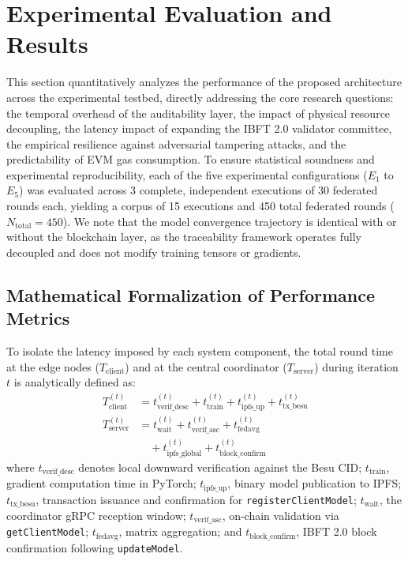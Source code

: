 \section{Experimental Evaluation and Results}
\label{sec:evaluacion}

This section quantitatively analyzes the performance of the proposed architecture across the experimental testbed, directly addressing the core research questions: the temporal overhead of the auditability layer, the impact of physical resource decoupling, the latency impact of expanding the IBFT 2.0 validator committee, the empirical resilience against adversarial tampering attacks, and the predictability of EVM gas consumption. To ensure statistical soundness and experimental reproducibility, each of the five experimental configurations ($E_1$ to $E_5$) was evaluated across 3 complete, independent executions of 30 federated rounds each, yielding a corpus of 15 executions and 450 total federated rounds ($N_{\text{total}} = 450$). We note that the model convergence trajectory is identical with or without the blockchain layer, as the traceability framework operates fully decoupled and does not modify training tensors or gradients.

\subsection{Mathematical Formalization of Performance Metrics}
To isolate the latency imposed by each system component, the total round time at the edge nodes ($T_{\text{client}}$) and at the central coordinator ($T_{\text{server}}$) during iteration $t$ is analytically defined as:
\begin{align}
T_{\text{client}}^{(t)} &= t_{\text{verif\_desc}}^{(t)} + t_{\text{train}}^{(t)} + t_{\text{ipfs\_up}}^{(t)} + t_{\text{tx\_besu}}^{(t)} \label{eq:t_client} \\
T_{\text{server}}^{(t)} &= t_{\text{wait}}^{(t)} + t_{\text{verif\_asc}}^{(t)} + t_{\text{fedavg}}^{(t)} \nonumber \\
&\quad + t_{\text{ipfs\_global}}^{(t)} + t_{\text{block\_confirm}}^{(t)} \label{eq:t_server}
\end{align}
where $t_{\text{verif\_desc}}$ denotes local downward verification against the Besu CID; $t_{\text{train}}$, gradient computation time in PyTorch; $t_{\text{ipfs\_up}}$, binary model publication to IPFS; $t_{\text{tx\_besu}}$, transaction issuance and confirmation for \texttt{registerClientModel}; $t_{\text{wait}}$, the coordinator gRPC reception window; $t_{\text{verif\_asc}}$, on-chain validation via \texttt{getClientModel}; $t_{\text{fedavg}}$, matrix aggregation; and $t_{\text{block\_confirm}}$, IBFT 2.0 block confirmation following \texttt{updateModel}.

